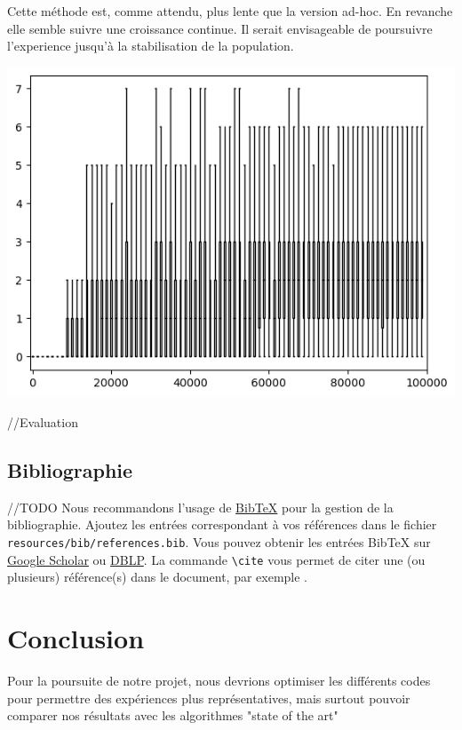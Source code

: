 \documentclass[a4paper, 12pt]{report}
\begin{document}
Cette méthode est, comme attendu, plus lente que la version ad-hoc. En revanche elle semble suivre une croissance continue. Il serait envisageable de poursuivre l'experience jusqu'à la stabilisation de la population.
	
	
\includegraphics{learner_boxplot}
	
	//Evaluation 

    \section{Bibliographie}
//TODO
Nous recommandons l'usage de \href{https://fr.wikipedia.org/wiki/BibTeX}{BibTeX} pour la gestion de la bibliographie. Ajoutez les entrées correspondant à vos références dans le fichier \verb+resources/bib/references.bib+. Vous pouvez obtenir les entrées BibTeX sur \href{https://scholar.google.com}{Google Scholar} ou \href{https://dblp.uni-trier.de}{DBLP}. La commande \verb+\cite+ vous permet de citer une (ou plusieurs) référence(s) dans le document, par exemple \cite{pakin2020comprehensive,RusselNorvig}.

\chapter{Conclusion}
Pour la poursuite de notre projet, nous devrions optimiser les différents codes pour permettre des expériences plus représentatives, mais surtout pouvoir comparer nos résultats avec les algorithmes "state of the art"


    \appendix
\end{document}
